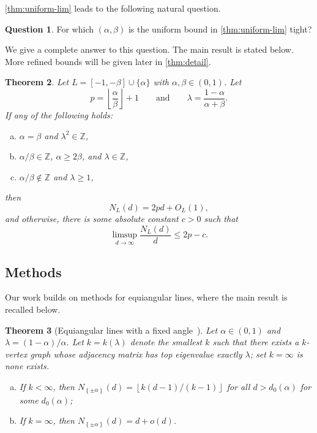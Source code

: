 \documentclass[reqno, 11pt]{amsart}
\newtheorem{theorem}{Theorem}[section]
\theoremstyle{definition}
\newtheorem{question}[theorem]{Question}
\theoremstyle{remark}
\newcommand{\floor}[1]{\left\lfloor #1 \right\rfloor}
\newcommand{\set}[1]{\left\{ #1 \right\}}
\newcommand{\ZZ}{\mathbb{Z}}
\begin{document}
\cref{thm:uniform-lim} leads to the following natural question.

\begin{question}
    For which $(\alpha,\beta)$ is the uniform bound in \cref{thm:uniform-lim} tight?
\end{question}

We give a complete answer to this question. The main result is stated below.
More refined bounds will be given later in \cref{thm:detail}.

\begin{theorem} \label{thm:main}
Let $L = [-1, -\beta] \cup \{\alpha\}$ with $\alpha,\beta \in (0,1)$. 
Let 
\[
p = \floor{\frac{\alpha}{\beta}} + 1
\qquad 
\text{and} \qquad
\lambda = \frac{1-\alpha}{\alpha +\beta}.
\]
If any of the following holds:
\begin{enumerate}[(a)]
    \item $\alpha = \beta$ and $\lambda^2 \in \ZZ$,
    \item $\alpha/\beta \in \ZZ$, $\alpha \ge 2\beta$, and $\lambda \in \ZZ$,
    \item $\alpha/\beta \notin \ZZ$ and $\lambda \ge 1$,
\end{enumerate}
then 
\[
    N_L(d) = 2pd + O_L(1),
\]
and otherwise, there is some absolute constant $c > 0$ such that
\[
\limsup_{d \to \infty} \frac{N_L(d)}{d} \le 2p-c.
\]
\end{theorem}



\subsection{Methods}
Our work builds on methods for equiangular lines, where the main result is recalled below.

\begin{theorem}[Equiangular lines with a fixed angle~\cite{JTYZZ21}] \label{thm:equiangular}
    Let $ \alpha \in (0,1)$ and $\lambda = (1-\alpha)/\alpha$. Let $k = k(\lambda)$ denote the smallest $k$ such that there exists a $k$-vertex graph whose adjacency matrix has top eigenvalue exactly $\lambda$; set $k = \infty$ is none exists. 
    \begin{enumerate}[(a)]
        \item \label{itm:equiangular-a} If $k < \infty$, then $N_{\set{\pm \alpha}} (d) = \floor{k(d-1)/(k-1)}$ for all $d > d_0(\alpha)$ for some $d_0(\alpha)$;
        \item \label{itm:equiangular-b} If $k = \infty$, then $N_{\set{\pm\alpha}}(d) = d + o(d)$.
    \end{enumerate}
\end{theorem}
\end{document}

